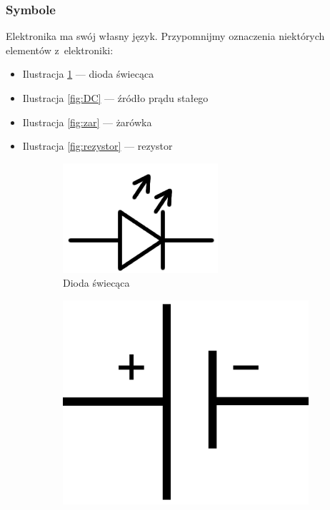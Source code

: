 \documentclass[a4paper,12pt, twoside]{article}
\begin{document}
	\subsubsection {Symbole}
	Elektronika ma swój własny język. Przypomnijmy oznaczenia niektórych elementów z~elektroniki:
\begin{itemize}
	\item Ilustracja \ref{fig:dioda} --- dioda świecąca
	\item Ilustracja \ref{fig:DC} --- źródło prądu stałego
	\item Ilustracja \ref{fig:zar} --- żarówka
	\item Ilustracja \ref{fig:rezystor} --- rezystor
\end{itemize}
\begin{figure}
	\centering
	\begin{subfigure}[h!]{0.25\textwidth}
      \centering
      \includegraphics[scale=0.3]{dioda_swiec.png}
      \caption{Dioda świecąca}
			\label{fig:dioda}
   \end{subfigure}
	\begin{subfigure}[h]{0.25\textwidth}
      \centering
      \includegraphics[scale=0.05]{DC-Source.png}

\end{subfigure}
\end{figure}
\end{document}
